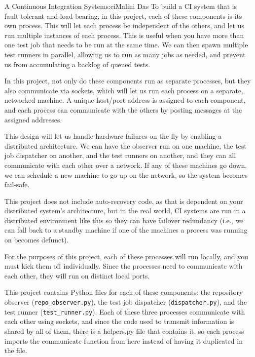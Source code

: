 \begin{aosachapter}{A Continuous Integration System}{s:ci}{Malini Das}
To build a CI system that is fault-tolerant and load-bearing, in this
project, each of these components is its own process. This will let each
process be independent of the others, and let us run multiple instances
of each process. This is useful when you have more than one test job
that needs to be run at the same time. We can then spawn multiple test
runners in parallel, allowing us to run as many jobs as needed, and
prevent us from accumulating a backlog of queued tests.

In this project, not only do these components run as separate processes,
but they also communicate via sockets, which will let us run each
process on a separate, networked machine. A unique host/port address is
assigned to each component, and each process can communicate with the
others by posting messages at the assigned addresses.

This design will let us handle hardware failures on the fly by enabling
a distributed architecture. We can have the observer run on one machine,
the test job dispatcher on another, and the test runners on another, and
they can all communicate with each other over a network. If any of these
machines go down, we can schedule a new machine to go up on the network,
so the system becomes fail-safe.

This project does not include auto-recovery code, as that is dependent
on your distributed system's architecture, but in the real world, CI
systems are run in a distributed environment like this so they can have
failover redundancy (i.e., we can fall back to a standby machine if one
of the machines a process was running on becomes defunct).

For the purposes of this project, each of these processes will run
locally, and you must kick them off individually. Since the processes
need to communicate with each other, they will run on distinct local
ports.

\label{files-in-this-project}

This project contains Python files for each of these components: the
repository observer (\texttt{repo\_observer.py}), the test job
dispatcher (\texttt{dispatcher.py}), and the test runner
(\texttt{test\_runner.py}). Each of these three processes communicate
with each other using sockets, and since the code used to transmit
information is shared by all of them, there is a helpers.py file that
contains it, so each process imports the communicate function from here
instead of having it duplicated in the file.


\end{aosachapter}
